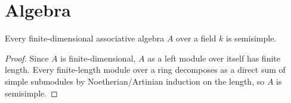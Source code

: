 \section{Algebra}

\begin{theorem}
Every finite-dimensional associative algebra $A$ over a field $k$ is
semisimple.
\end{theorem}

\begin{proof}
Since $A$ is finite-dimensional, $A$ as a left module over itself has
finite length. Every finite-length module over a ring decomposes as a
direct sum of simple submodules by Noetherian/Artinian induction on the
length, so $A$ is semisimple.
\end{proof}
